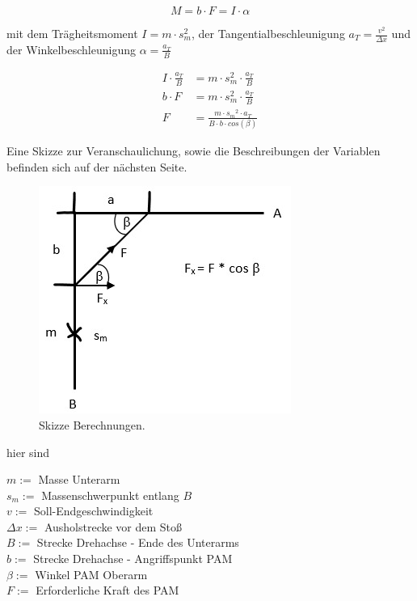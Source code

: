 \begin{equation}
	M = b \cdot F = I \cdot \alpha
	\label{eq:DrehmomentArm}
	\end{equation}
	
	mit dem Trägheitsmoment \( I = m \cdot s_m^2 \), der Tangentialbeschleunigung \( a_T = \frac{v^2}{\Delta x} \) und der
	Winkelbeschleunigung \( \alpha = \frac{a_T}{B} \) \par\medskip
	
	\begin{align}
	I \cdot \frac{a_T}{B} &= m \cdot s_m^2 \cdot \frac{a_T}{B} \nonumber\\
	b \cdot F &= m \cdot s_m^2 \cdot \frac{a_T}{B} \nonumber\\
	F &=\frac{m \cdot {s_m}^2 \cdot a_T}{B \cdot b \cdot cos(\beta)}
	\label{eq:Kraft-PAM}
	\end{align}

	Eine Skizze zur Veranschaulichung, sowie die Beschreibungen der Variablen befinden sich auf der nächsten Seite. 
	
	\newpage
	\begin{figure}[h]
		\centering
		\includegraphics[width=.5\textwidth]{Abb/SkizzeBerechnungen.jpeg}
		\caption{Skizze Berechnungen.}
		\label{fig:SkizzeBerechnungen}
	\end{figure}

	hier sind
	
	\( m := \) Masse Unterarm \\
	\( s_m := \) Massenschwerpunkt entlang $ B $ \\
	\( v := \) Soll-Endgeschwindigkeit \\
	\( \Delta x := \) Ausholstrecke vor dem Stoß \\
	\( B := \) Strecke Drehachse - Ende des Unterarms \\
	\( b:= \) Strecke Drehachse - Angriffspunkt PAM \\
	\( \beta := \) Winkel PAM  Oberarm \\
	\( F:= \) Erforderliche Kraft des PAM